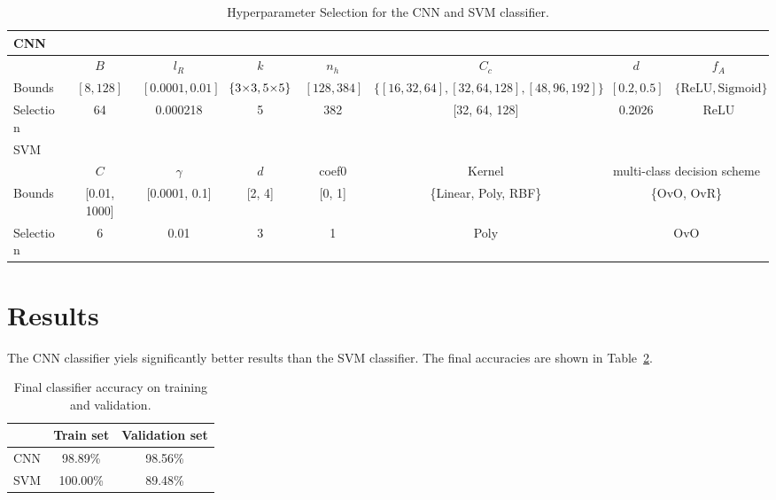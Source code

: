 \documentclass[a4, 10 pt, conference]{ieeeconf}  %
\begin{document}
\renewcommand{\arraystretch}{1.2}
\begin{table}[htbp]
  \centering
  \begin{tabular}{|l|c|c|c|c|c|c|c|}
    \hline
    \multicolumn{8}{|l|}{CNN} \\
    \hline
    & $B$ & $l_R$ & $k$ & $n_h$ & $C_c$ & $d$ & $f_A$ \\
    \hline
    Bounds & $[8,128]$ & $[0.0001, 0.01]$ & $\{\text{3\texttimes3}, \text{5\texttimes5}\}$ & $[128,384]$ & $\{[16,32,64],[32,64,128],[48,96,192]\}$ & $[0.2,0.5]$ & $\{\text{ReLU}, \text{Sigmoid}\}$ \\
    Selection & 64 & 0.000218 & 5\texttimes5 & 382 & [32, 64, 128] & 0.2026 & ReLU\\
    \hline
    \multicolumn{8}{|l|}{SVM} \\
    \hline
    & $C$ & $\gamma$ & $d$ & coef0 & Kernel & \multicolumn{2}{c|}{multi-class decision scheme} \\
    \hline
    Bounds & [0.01, 1000] & [0.0001, 0.1] & [2, 4] & [0, 1] & \{Linear, Poly, RBF\} & \multicolumn{2}{c|}{\{OvO, OvR\}} \\
    Selection & 6 & 0.01 & 3 & 1 & Poly & \multicolumn{2}{c|}{OvO} \\
    \hline
  \end{tabular}
  \caption{Hyperparameter Selection for the CNN and SVM classifier.}
  \label{fig:hyperparameter_selection}
\end{table}

\section{Results}
\label{sec:results}

The CNN classifier yiels significantly better results than the SVM classifier.
The final accuracies are shown in Table~\ref{tab:classifier_accuracy}.


\begin{table}[H]
  \centering
  \begin{tabular}{|l|c|c|}
    \hline
    & Train set & Validation set\\
    \hline
    CNN & 98.89\% & 98.56\% \\
    SVM & 100.00\% & 89.48\% \\
    \hline
  \end{tabular}
  \caption{Final classifier accuracy on training and validation.}
  \label{tab:classifier_accuracy}
\end{table}
\end{document}
